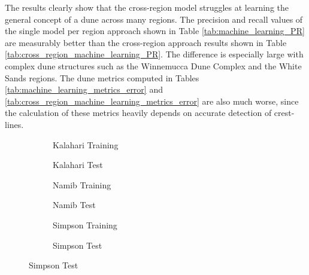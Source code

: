 The results clearly show that the cross-region model struggles at learning the general concept of a dune across many regions. The precision and recall values of the single model per region approach shown in Table \ref{tab:machine_learning_PR} are measurably better than the cross-region approach results shown in Table \ref{tab:cross_region_machine_learning_PR}. The difference is especially large with complex dune structures such as the Winnemucca Dune Complex and the White Sands regions. The dune metrics computed in Tables \ref{tab:machine_learning_metrics_error} and \ref{tab:cross_region_machine_learning_metrics_error} are also much worse, since the calculation of these metrics heavily depends on accurate detection of crest-lines.  

\begin{figure}
	\centering
	\begin{subfigure}{0.48\textwidth}
		\centering
		\caption{ Kalahari Training }
		\label{fig:ml_kalahari_results}
	\end{subfigure}
	\begin{subfigure}{0.48\textwidth}
		\centering
		\caption{ Kalahari Test }
		\label{fig:ml_kalahari_test_results}
	\end{subfigure}
	\begin{subfigure}{0.48\textwidth}
		\centering
		\caption{ Namib Training }
		\label{fig:ml_namib_results}
	\end{subfigure}
	\begin{subfigure}{0.48\textwidth}
		\centering
		\caption{ Namib Test }
		\label{fig:ml_namib_test_results}
	\end{subfigure}
	\begin{subfigure}{0.48\textwidth}
		\centering
		\caption{ Simpson Training }
		\label{fig:ml_simpson_results}
	\end{subfigure}
	\begin{subfigure}{0.48\textwidth}
		\centering
		\caption{ Simpson Test }
		\label{fig:ml_simpson_test_results}
	\end{subfigure}
\end{figure}
